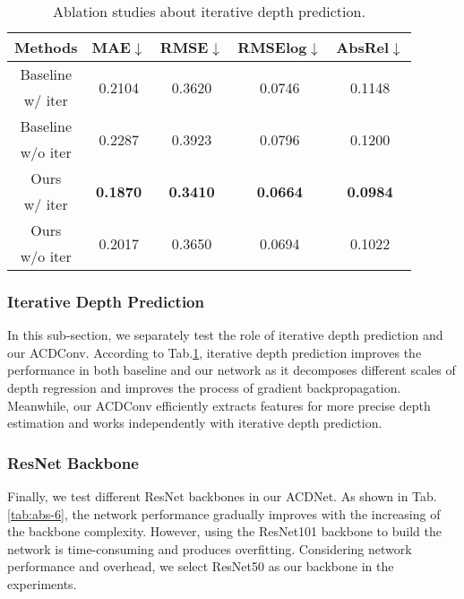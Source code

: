 \documentclass[letterpaper]{article} \usepackage{aaai21}  \usepackage{times}  \usepackage{helvet} \usepackage{courier}  \usepackage[hyphens]{url}  \usepackage{graphicx} \urlstyle{rm} \def\UrlFont{\rm}  \usepackage{natbib}  \usepackage{caption} \frenchspacing  \setlength{\pdfpagewidth}{8.5in}  \setlength{\pdfpageheight}{11in}
\newcommand{\newchange}[1]{{\color{black}#1}}
\begin{document}
\begin{table}[tb]
    \centering
    \begin{tabular}{ccccc} 
\toprule 
Methods & MAE$\downarrow$ & RMSE$\downarrow$ & RMSElog$\downarrow$ &  AbsRel$\downarrow$ \\
\midrule 
\small{Baseline} & \multirow{2}{*}{0.2104} & \multirow{2}{*}{0.3620} & \multirow{2}{*}{0.0746} & \multirow{2}{*}{0.1148} \\
\small{w/ iter} & ~ & ~ & ~ & ~\\
\small{Baseline} & \multirow{2}{*}{0.2287} & \multirow{2}{*}{0.3923} & \multirow{2}{*}{0.0796} & \multirow{2}{*}{0.1200}\\
\small{w/o iter} & ~ & ~ & ~ & ~\\
\small{Ours}   & \multirow{2}{*}{\textbf{0.1870}} & \multirow{2}{*}{\textbf{0.3410}} & \multirow{2}{*}{\textbf{0.0664}} & \multirow{2}{*}{\textbf{0.0984}} \\
\small{w/ iter} & ~ & ~ & ~ & ~\\
\small{Ours} & \multirow{2}{*}{0.2017} & \multirow{2}{*}{0.3650} & \multirow{2}{*}{0.0694} & \multirow{2}{*}{0.1022} \\
\small{w/o iter} & ~ & ~ & ~ & ~\\
\bottomrule
    \end{tabular}
    \caption{Ablation studies about iterative depth prediction.}
    \label{tab:abs-5}
\end{table}

\newchange{
\subsubsection{Iterative Depth Prediction}
In this sub-section, we separately test the role of iterative depth prediction and our ACDConv.
According to Tab.\ref{tab:abs-5}, iterative depth prediction improves the performance in both baseline and our network as it decomposes different scales of depth regression and improves the process of gradient backpropagation. 
Meanwhile, our ACDConv efficiently extracts features for more precise depth estimation and works independently with iterative depth prediction.
}






\subsubsection{ResNet Backbone}
Finally, we test different ResNet backbones in our ACDNet. As shown in Tab.\ref{tab:abs-6}, the network performance gradually improves with the increasing of the backbone complexity. However, using the ResNet101 backbone to build the network is time-consuming and produces overfitting. Considering network performance and overhead, we select ResNet50 as our backbone in the experiments.
\end{document}
